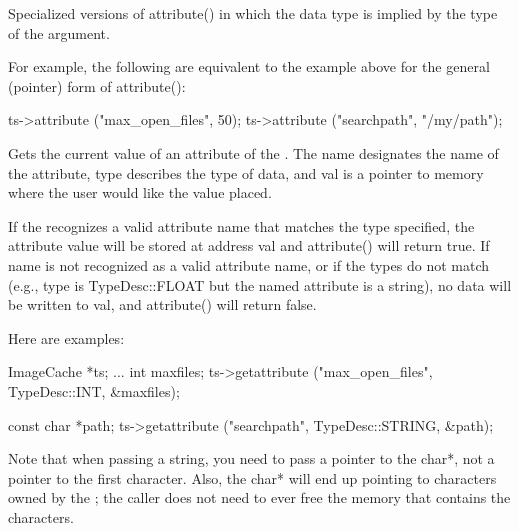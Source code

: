 \apiend

Specialized versions of {\cf attribute()} in which the data type is
implied by the type of the argument.

For example, the following are equivalent to the example above for the
general (pointer) form of {\cf attribute()}:

\begin{code}
      ts->attribute ("max_open_files", 50);
      ts->attribute ("searchpath", "/my/path");
\end{code}

\apiend



Gets the current value of an attribute of the \ImageCache.
The {\cf name} designates the name of the attribute, {\cf type}
describes the type of data, and {\cf val} is a pointer to memory 
where the user would like the value placed.

If the \ImageCache recognizes a valid attribute name that matches the
type specified, the attribute value will be stored at address {\cf val}
and {\cf attribute()} will return {\cf true}.  If {\cf name} is not recognized
as a valid attribute name, or if the types do not match (e.g., {\cf
  type} is {\cf TypeDesc::FLOAT} but the named attribute is a string),
no data will be written to {\cf val}, and {\cf attribute()} will return
{\cf false}.

Here are examples:

\begin{code}
      ImageCache *ts; 
      ...
      int maxfiles;
      ts->getattribute ("max_open_files", TypeDesc::INT, &maxfiles);

      const char *path;
      ts->getattribute ("searchpath", TypeDesc::STRING, &path);
\end{code}

Note that when passing a string, you need to pass a pointer to the {\cf
  char*}, not a pointer to the first character.  Also, the {\cf char*}
will end up pointing to characters owned by the \ImageCache; the
caller does not need to ever free the memory that contains the
characters.

